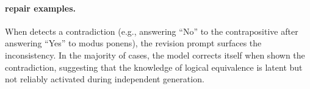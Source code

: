 \paragraph{\method{} repair examples.}
When \method{} detects a contradiction (e.g., answering ``No'' to the contrapositive after answering ``Yes'' to modus ponens), the revision prompt surfaces the inconsistency. In the majority of cases, the model corrects itself when shown the contradiction, suggesting that the knowledge of logical equivalence is latent but not reliably activated during independent generation.